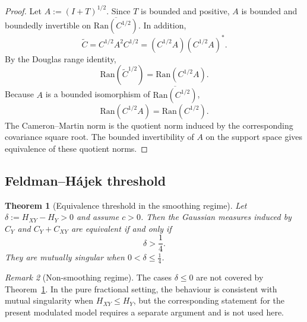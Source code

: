 \documentclass[11pt,a4paper]{amsart}
\theoremstyle{plain}
\newtheorem{theorem}{Theorem}[section]
\theoremstyle{definition}
\theoremstyle{remark}
\newtheorem{remark}[theorem]{Remark}
\begin{document}
\begin{proof}
Let $A:=(I+T)^{1/2}$. Since $T$ is bounded and positive, $A$ is bounded and boundedly invertible on $\overline{\mathrm{Ran}(C^{1/2})}$. In addition,
\[
\widetilde C=C^{1/2}A^2C^{1/2}=(C^{1/2}A)(C^{1/2}A)^*.
\]
By the Douglas range identity,
\[
\mathrm{Ran}(\widetilde C^{1/2})=\mathrm{Ran}(C^{1/2}A).
\]
Because $A$ is a bounded isomorphism of $\overline{\mathrm{Ran}(C^{1/2})}$,
\[
\mathrm{Ran}(C^{1/2}A)=\mathrm{Ran}(C^{1/2}).
\]
The Cameron--Martin norm is the quotient norm induced by the corresponding covariance square root.
The bounded invertibility of $A$ on the support space gives equivalence of these quotient norms.
\end{proof}

\subsection{Feldman--H\'ajek threshold}

\begin{theorem}[Equivalence threshold in the smoothing regime]\label{thm:FH_final}
Let $\delta:=H_{XY}-H_Y>0$ and assume $c>0$. Then the Gaussian measures induced by
$C_Y$ and $C_Y + C_{XY}$ are equivalent if and only if
\[
\delta>\frac14.
\]
They are mutually singular when $0<\delta\le\frac14$.
\end{theorem}

\begin{remark}[Non-smoothing regime]
The cases $\delta\le 0$ are not covered by Theorem~\ref{thm:FH_final}.  In the pure fractional
setting, the behaviour is consistent with mutual singularity when $H_{XY}\le H_Y$, but the
corresponding statement for the present modulated model requires a separate argument and is not
used here.
\end{remark}
\end{document}
